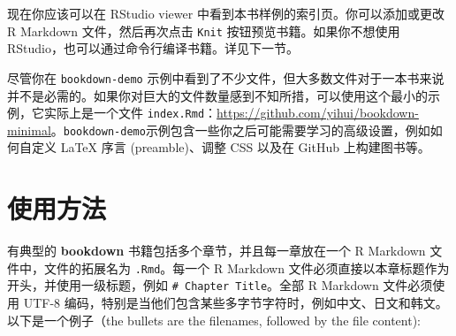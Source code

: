 \documentclass[
  12pt,
]{krantz}
\theoremstyle{definition}
\theoremstyle{definition}
\theoremstyle{definition}
\theoremstyle{definition}
\theoremstyle{remark}
\begin{document}
现在你应该可以在 RStudio viewer 中看到本书样例的索引页。你可以添加或更改 R Markdown 文件，然后再次点击 \texttt{Knit} 按钮预览书籍。如果你不想使用 RStudio，也可以通过命令行编译书籍。详见下一节。

尽管你在 \texttt{bookdown-demo} 示例中看到了不少文件，但大多数文件对于一本书来说并不是必需的。如果你对巨大的文件数量感到不知所措，可以使用这个最小的示例，它实际上是一个文件 \texttt{index.Rmd}：\url{https://github.com/yihui/bookdown-minimal}。\texttt{bookdown-demo}示例包含一些你之后可能需要学习的高级设置，例如如何自定义 LaTeX 序言 (preamble)、调整 CSS 以及在 GitHub 上构建图书等。

\section{使用方法}\label{usage}

有典型的 \textbf{bookdown} 书籍包括多个章节，并且每一章放在一个 R Markdown 文件中，文件的拓展名为 \texttt{.Rmd}。每一个 R Markdown 文件必须直接以本章标题作为开头，并使用一级标题，例如 \texttt{\#\ Chapter\ Title}。全部 R Markdown 文件必须使用 UTF-8 编码，特别是当他们包含某些多字节字符时，例如中文、日文和韩文。以下是一个例子（the bullets are the filenames, followed by the file content):
\end{document}
